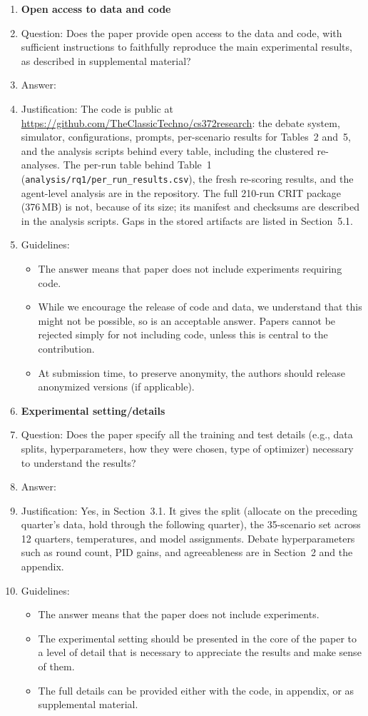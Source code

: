 \begin{enumerate}
\item {\bf Open access to data and code}
    \item[] Question: Does the paper provide open access to the data and code, with sufficient instructions to faithfully reproduce the main experimental results, as described in supplemental material?
    \item[] Answer: \answerYes{}
    \item[] Justification: The code is public at \url{https://github.com/TheClassicTechno/cs372research}: the debate system, simulator, configurations, prompts, per-scenario results for Tables~2 and~5, and the analysis scripts behind every table, including the clustered re-analyses. The per-run table behind Table~1 (\texttt{analysis/rq1/per\_run\_results.csv}), the fresh re-scoring results, and the agent-level analysis are in the repository. The full 210-run CRIT package (376\,MB) is not, because of its size; its manifest and checksums are described in the analysis scripts. Gaps in the stored artifacts are listed in Section~5.1.
    \item[] Guidelines:
    \begin{itemize}
        \item The answer \answerNA{} means that paper does not include experiments requiring code.
        \item While we encourage the release of code and data, we understand that this might not be possible, so \answerNo{} is an acceptable answer. Papers cannot be rejected simply for not including code, unless this is central to the contribution.
        \item At submission time, to preserve anonymity, the authors should release anonymized versions (if applicable).
    \end{itemize}

\item {\bf Experimental setting/details}
    \item[] Question: Does the paper specify all the training and test details (e.g., data splits, hyperparameters, how they were chosen, type of optimizer) necessary to understand the results?
    \item[] Answer: \answerYes{}
    \item[] Justification: Yes, in Section~3.1. It gives the split (allocate on the preceding quarter's data, hold through the following quarter), the 35-scenario set across 12 quarters, temperatures, and model assignments. Debate hyperparameters such as round count, PID gains, and agreeableness are in Section~2 and the appendix.
    \item[] Guidelines:
    \begin{itemize}
        \item The answer \answerNA{} means that the paper does not include experiments.
        \item The experimental setting should be presented in the core of the paper to a level of detail that is necessary to appreciate the results and make sense of them.
        \item The full details can be provided either with the code, in appendix, or as supplemental material.
    \end{itemize}


\end{enumerate}
